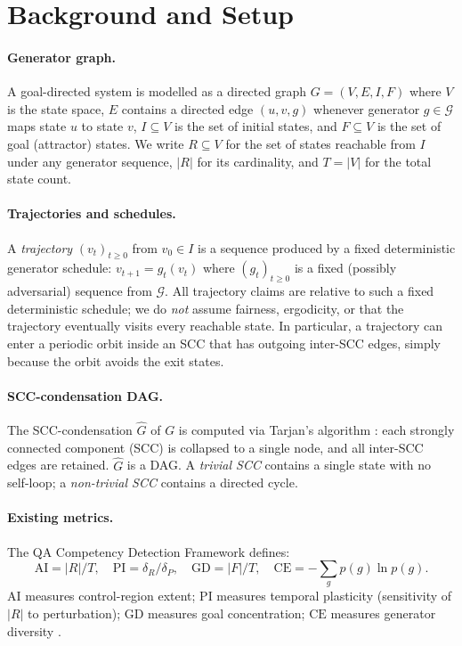 \documentclass[11pt,letterpaper]{article}
\theoremstyle{plain}
\theoremstyle{definition}
\theoremstyle{remark}
\newcommand{\AI}{\mathrm{AI}}
\newcommand{\PI}{\mathrm{PI}}
\newcommand{\GD}{\mathrm{GD}}
\newcommand{\CE}{\mathrm{CE}}
\newcommand{\gens}{\mathcal{G}}
\newcommand{\Ghat}{\hat{G}}
\begin{document}
\section{Background and Setup}
\label{sec:setup}

\paragraph{Generator graph.}
A goal-directed system is modelled as a directed graph $G = (V, E, I, F)$
where $V$ is the state space, $E$ contains a directed edge $(u,v,g)$ whenever
generator $g \in \gens$ maps state $u$ to state $v$,
$I \subseteq V$ is the set of initial states, and $F \subseteq V$ is the set
of goal (attractor) states.
We write $R \subseteq V$ for the set of states reachable from $I$ under any
generator sequence, $|R|$ for its cardinality,
and $T = |V|$ for the total state count.

\paragraph{Trajectories and schedules.}
A \emph{trajectory} $(v_t)_{t \ge 0}$ from $v_0 \in I$ is a sequence produced
by a fixed deterministic generator schedule: $v_{t+1} = g_t(v_t)$ where
$(g_t)_{t \ge 0}$ is a fixed (possibly adversarial) sequence from $\gens$.
All trajectory claims are relative to such a fixed deterministic schedule;
we do \emph{not} assume fairness, ergodicity, or that the trajectory
eventually visits every reachable state.
In particular, a trajectory can enter a periodic orbit inside an SCC that has
outgoing inter-SCC edges, simply because the orbit avoids the exit states.

\paragraph{SCC-condensation DAG.}
The SCC-condensation $\Ghat$ of $G$ is computed via Tarjan's algorithm
\cite{tarjan1972depth}: each strongly connected component (SCC) is collapsed
to a single node, and all inter-SCC edges are retained.
$\Ghat$ is a DAG.
A \emph{trivial SCC} contains a single state with no self-loop;
a \emph{non-trivial SCC} contains a directed cycle.

\paragraph{Existing metrics.}
The QA Competency Detection Framework \cite{QAFamily26Cert} defines:
\[
  \AI = |R|/T, \quad
  \PI = \delta_R/\delta_P, \quad
  \GD = |F|/T, \quad
  \CE = -\textstyle\sum_g p(g)\ln p(g).
\]
$\AI$ measures control-region extent; $\PI$ measures temporal plasticity
(sensitivity of $|R|$ to perturbation); $\GD$ measures goal concentration;
$\CE$ measures generator diversity \cite{shannon1948mathematical}.
\end{document}

